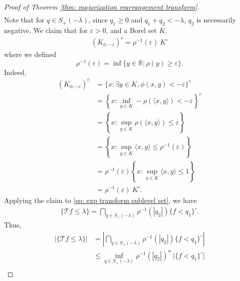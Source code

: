 \documentclass[11pt]{article}
\newcommand{\1}{[1]}
\begin{document}
\begin{proof}[Proof of Theorem \ref{thm: majorization rearrangement transform}]
\begin{align}
    \end{align}
    Note that for $q \in S_+(-\lambda)$, since $q_1 \geq 0$ and $q_1 + q_2 < -\lambda$, $q_2$ is necessarily negative.
    We claim that for $\varepsilon >0$, and a Borel set $K$,
     \begin{align*} %
        (K_{\phi,-\varepsilon})^c = \rho^{-1}(\varepsilon) \ K^\circ
    \end{align*} 
    where we defined 
    $$
    \rho^{-1}(\varepsilon)=\inf \{y \in\mathbb{R}:\rho(y)\geq\varepsilon\} .
    $$
    Indeed,
    \begin{align*}
        (K_{\phi,-\varepsilon})^c
            &=
                \{ x : \exists y \in K, \phi(x,y) < - \varepsilon \}^c
                    \\
            &=
                \left\{ x: \inf_{y \in K} - \rho(\langle x,y \rangle) < - \varepsilon \right\}^c
                    \\
            &=
                \left\{ x : \sup_{y \in K} \rho(\langle x,y \rangle) \leq \varepsilon \right\}
                    \\
            &=
                \left\{ x : \sup_{y \in K} \langle x,y \rangle \leq \rho^{-1}(\varepsilon) \right\}
                    \\
            &=
                \rho^{-1}(\varepsilon) \left\{ x : \sup_{y \in K} \langle x,y \rangle \leq 1 \right\}
                    \\
            &=
                \rho^{-1}(\varepsilon) \ K^\circ.
    \end{align*}
    Applying the claim to \eqref{eq: exp transform sublevel set}, we have 
    \begin{align} \label{eq:sub-level-description}
        \{ \mathcal{T} f \leq \lambda \} = \bigcap_{q \in S_+(-\lambda)} \rho^{-1}(|q_2|) \{ f < q_1 \}^\circ .
    \end{align}
    Thus,
    \begin{align*}
        |\{ \mathcal{T} f \leq \lambda \}| 
            &=
                \left|  \bigcap_{q \in S_+(-\lambda)} \rho^{-1}(|q_2|) \{ f < q_1 \}^\circ \right|
                    \\
            &\leq 
                \inf_{q \in S_+(-\lambda)} \rho^{-1}(|q_2|)^n \ \big| \{f < q_1 \}^\circ \big|
                    \\

\end{align*}
\end{proof}
\end{document}
